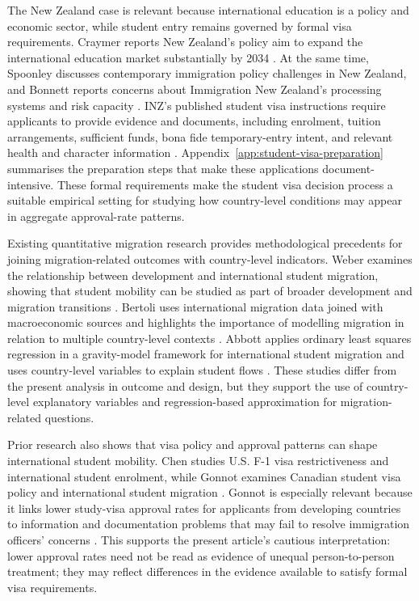 \documentclass[runningheads]{llncs}
\begin{document}
The New Zealand case is relevant because international education is a policy and economic sector, while student entry remains governed by formal visa requirements. Craymer reports New Zealand's policy aim to expand the international education market substantially by 2034 \cite{Craymer2025}. At the same time, Spoonley discusses contemporary immigration policy challenges in New Zealand, and Bonnett reports concerns about Immigration New Zealand's processing systems and risk capacity \cite{Spoonley2025,Bonnett2024}. INZ's published student visa instructions require applicants to provide evidence and documents, including enrolment, tuition arrangements, sufficient funds, bona fide temporary-entry intent, and relevant health and character information \cite{INZEvidence}. Appendix~\ref{app:student-visa-preparation} summarises the preparation steps that make these applications document-intensive. These formal requirements make the student visa decision process a suitable empirical setting for studying how country-level conditions may appear in aggregate approval-rate patterns.

Existing quantitative migration research provides methodological precedents for joining migration-related outcomes with country-level indicators. Weber examines the relationship between development and international student migration, showing that student mobility can be studied as part of broader development and migration transitions \cite{Weber2023}. Bertoli uses international migration data joined with macroeconomic sources and highlights the importance of modelling migration in relation to multiple country-level contexts \cite{Bertoli2013}. Abbott applies ordinary least squares regression in a gravity-model framework for international student migration and uses country-level variables to explain student flows \cite{Abbott2016}. These studies differ from the present analysis in outcome and design, but they support the use of country-level explanatory variables and regression-based approximation for migration-related questions.

Prior research also shows that visa policy and approval patterns can shape international student mobility. Chen studies U.S. F-1 visa restrictiveness and international student enrolment, while Gonnot examines Canadian student visa policy and international student migration \cite{Chen2023,Gonnot2025}. Gonnot is especially relevant because it links lower study-visa approval rates for applicants from developing countries to information and documentation problems that may fail to resolve immigration officers' concerns \cite{Gonnot2025}. This supports the present article's cautious interpretation: lower approval rates need not be read as evidence of unequal person-to-person treatment; they may reflect differences in the evidence available to satisfy formal visa requirements.
\end{document}

